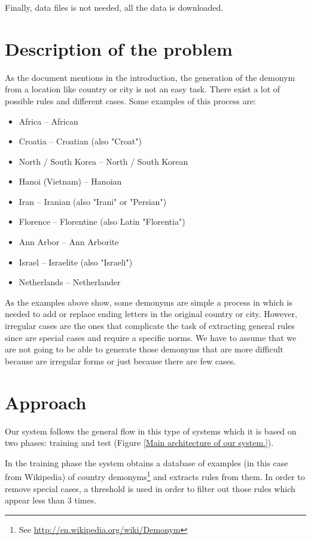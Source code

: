 \documentclass[]{report}
\begin{document}
Finally, data files is not needed, all the data is downloaded.

\section{Description of the problem}

As the document mentions in the introduction, the generation of the demonym from a location like country or city is not an easy task. There exist a lot of possible rules and different cases. 
\vspace{0.5cm}
Some examples of this process are:
\begin{itemize}
\item Africa -- African
\item Croatia -- Croatian (also "Croat")
\item North / South Korea -- North / South Korean
\item Hanoi (Vietnam) -- Hanoian
\item Iran -- Iranian (also "Irani" or "Persian")
\item Florence -- Florentine (also Latin "Florentia")
\item Ann Arbor -- Ann Arborite
\item Israel -- Israelite (also "Israeli")
\item Netherlands -- Netherlander
\end{itemize}

As the examples above show, some demonyms are simple a process in which is needed to add or replace ending letters in the original country or city. However, irregular cases are the ones that complicate the task of extracting general rules since are special cases and require a specific norms. We have to assume that we are not going to be able to generate those demonyms that are more difficult because are irregular forms or just because there are few cases.


\newpage
\section{Approach}


Our system follows the general flow in this type of systems which it is based on two phases: training and test (Figure \ref{Main architecture of our system.}). 

In the training phase the system obtains a database of examples (in this case from Wikipedia) of country demonyms\footnote{See \href{Wikipedia Demonym page}{http://en.wikipedia.org/wiki/Demonym}} and extracts rules from them.
In order to remove special cases, a threshold is used in order to filter out those rules which appear less than 3 times.
\end{document}
